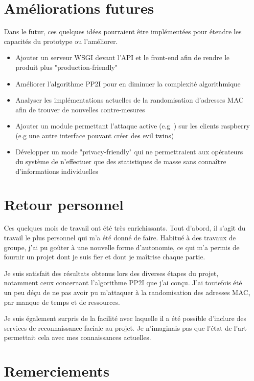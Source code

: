 \section{Améliorations futures}
Dans le futur, ces quelques idées pourraient être implémentées pour étendre les capacités du prototype ou l'améliorer.
\begin{itemize}
    \item Ajouter un serveur WSGI devant l'API et le front-end afin de rendre le produit plus "production-friendly"
    \item Améliorer l'algorithme PP2I pour en diminuer la complexité algorithmique
    \item Analyser les implémentations actuelles de la randomisation d'adresses MAC afin de trouver de nouvelles contre-mesures
    \item Ajouter un module permettant l'attaque active (e.g~\cite{WIFIKARMA}) sur les clients raspberry (e.g une autre interface pouvant créer des evil twins)
    \item Développer un mode "privacy-friendly" qui ne permettraient aux opérateurs du système de n'effectuer que des statistiques de masse sans connaître d'informations individuelles
\end{itemize}

\section{Retour personnel}
Ces quelques mois de travail ont été très enrichissants.
Tout d'abord, il s'agit du travail le plus personnel qui m'a été donné de faire.
Habitué à des travaux de groupe, j'ai pu goûter à une nouvelle forme d'autonomie, ce qui m'a permis de fournir
un projet dont je suis fier et dont je maîtrise chaque partie. 

Je suis satisfait des résultats obtenus lors des diverses étapes du projet, notamment ceux concernant l'algorithme PP2I que j'ai conçu.
J'ai toutefois été un peu déçu de ne pas avoir pu m'attaquer à la randomisation des adresses MAC, par manque de temps et de ressources.

Je suis également surpris de la facilité avec laquelle il a été possible d'inclure des services de reconnaissance faciale au projet. Je n'imaginais pas
que l'état de l'art permettait cela avec mes connaissances actuelles.

\section{Remerciements}

